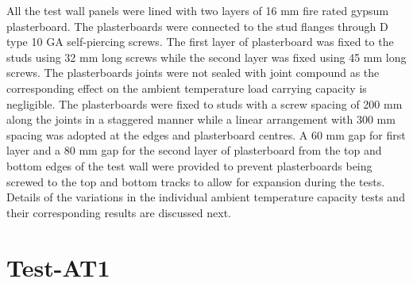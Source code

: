 All the test wall panels were lined with two layers of 16 mm fire rated gypsum plasterboard. The plasterboards were connected to the stud flanges through D type 10 GA self-piercing screws. The first layer of plasterboard was fixed to the studs using 32 mm long screws while the second layer was fixed using 45 mm long screws. The plasterboards joints were not sealed with joint compound as the corresponding effect on the ambient temperature load carrying capacity is negligible. The plasterboards were fixed to studs with a screw spacing of 200 mm along the joints in a staggered manner while a linear arrangement with 300 mm spacing was adopted at the edges and plasterboard centres. A 60 mm gap for first layer and a 80 mm gap for the second layer of plasterboard from the top and bottom edges of the test wall were provided to prevent plasterboards being screwed to the top and bottom tracks to allow for expansion during the tests. Details of the variations in the individual ambient temperature capacity tests and their corresponding results are discussed next.

\section{Test-AT1}

